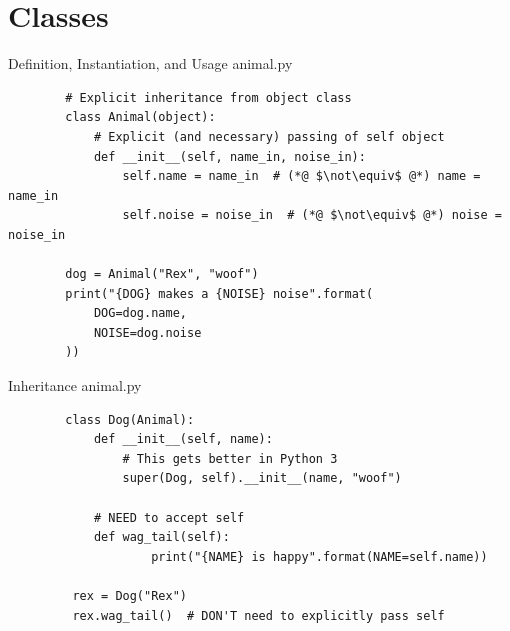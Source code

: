 \documentclass[11pt]{beamer}
\begin{document}
\section{Classes}
\begin{frame}[fragile]{Definition, Instantiation, and Usage}
	animal.py
	\begin{lstlisting}
		# Explicit inheritance from object class
		class Animal(object):
		    # Explicit (and necessary) passing of self object
		    def __init__(self, name_in, noise_in):
		        self.name = name_in  # (*@ $\not\equiv$ @*) name = name_in
		        self.noise = noise_in  # (*@ $\not\equiv$ @*) noise = noise_in

		dog = Animal("Rex", "woof")
		print("{DOG} makes a {NOISE} noise".format(
		    DOG=dog.name,
		    NOISE=dog.noise
		))
	\end{lstlisting}
\end{frame}

\begin{frame}[fragile]{Inheritance}
	animal.py
	\begin{lstlisting}
		class Dog(Animal):
		    def __init__(self, name):
		        # This gets better in Python 3
		        super(Dog, self).__init__(name, "woof")

		    # NEED to accept self
		    def wag_tail(self):
		    	    print("{NAME} is happy".format(NAME=self.name))

		 rex = Dog("Rex")
		 rex.wag_tail()  # DON'T need to explicitly pass self
	\end{lstlisting}
\end{frame}
\end{document}
